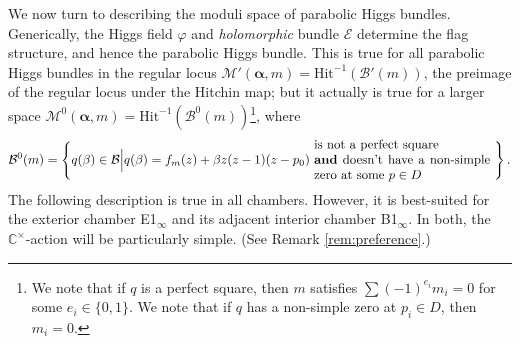 \documentclass[12pt,letterpaper,reqno]{amsart}
\def\mathbf#1{#1}%
\theoremstyle{remark}
\theoremstyle{definition}
\numberwithin{thm}{section}
\numberwithin{equation}{section}
\numberwithin{figure}{section}
\newcommand{\C}{\ensuremath{\mathbb C}}
\newcommand{\cE}{{\mathcal E}}
\begin{document}
We now turn to describing the moduli space of parabolic Higgs bundles. Generically, the Higgs field $\varphi$ and \emph{holomorphic} bundle 
$\cE$ determine the flag structure, and hence the parabolic Higgs bundle. This is true for all parabolic Higgs bundles in the regular locus
$\mathcal{M}'(\boldsymbol{\alpha}, \mathbf{m})=\mathrm{Hit}^{-1}(\mathcal{B}'(\mathbf{m}))$, the preimage of the regular locus under the Hitchin map; but it actually is true for 
a larger space $\mathcal{M}^0(\boldsymbol{\alpha}, \mathbf{m})=\mathrm{Hit}^{-1}(\mathcal{B}^0(\mathbf{m}))$\footnote{We note that if $q$ is a perfect square, then $\mathbf{m}$ satisfies $\sum (-1)^{e_i} m_i=0$ for some $e_i \in \{0, 1\}$. We note that if $q$ has a non-simple zero at $p_i \in D$, then $m_i = 0$.}, where
\begin{equation}
\mathcal{B}^{0}(\mathbf{m})=
\left\{q(\beta)
\in \mathcal{B}\Big| q(\beta)=f_{\mathbf{m}}(z) +\beta z(z-1)(z-p_0) \mbox{
\begin{minipage}{0.4\linewidth}
    is not a perfect square \\ \textbf{and} doesn't have a non-simple zero at some $p \in D$
  \end{minipage}
}\right\}.
\label{eq:B0}
\end{equation}
The following description is true in all chambers.  However, it is best-suited for the exterior chamber E1$_\infty$ and its adjacent interior chamber B1$_\infty$. In both, the $\C^\times$-action will be particularly simple. (See Remark \ref{rem:preference}.)
\end{document}
